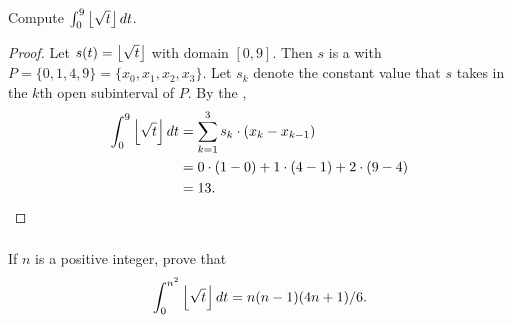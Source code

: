 \documentclass{report}
\begin{document}
\subsubsection{}%

  Compute $\int_0^9 \left\lfloor\sqrt{t}\right\rfloor \mathop{dt}$.

  \begin{proof}
    Let $s(t) = \left\lfloor\sqrt{t}\right\rfloor$ with domain $[0, 9]$.
    Then $s$ is a  with 
      $P = \{0, 1, 4, 9\} = \{x_0, x_1, x_2, x_3\}$.
    Let $s_k$ denote the constant value that $s$ takes in the $k$th open
      subinterval of $P$.
    By the ,
      \begin{align*}
        \int_0^9 \left\lfloor\sqrt{t}\right\rfloor \mathop{dt}
          & = \sum_{k=1}^3 s_k \cdot (x_k - x_{k-1}) \\
          & = 0 \cdot (1 - 0) + 1 \cdot (4 - 1) + 2 \cdot (9 - 4) \\
          & = 13.
      \end{align*}
  \end{proof}

\subsubsection{}%

  If $n$ is a positive integer, prove that
    $$\int_0^{n^2} \left\lfloor\sqrt{t}\right\rfloor \mathop{dt} = n(n - 1)(4n + 1) / 6.$$
\end{document}
